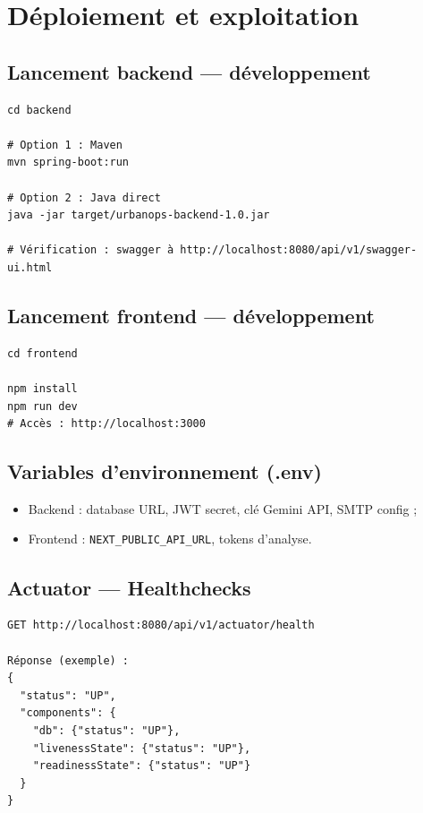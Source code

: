 \documentclass[12pt,a4paper,twoside,openright]{book}
\begin{document}
\chapter{Déploiement et exploitation}
\label{chap:deploy}

\section{Lancement backend — développement}
\begin{lstlisting}[style=bashurban,caption={Démarrage du backend Spring Boot.},label=lst:backend_run]
cd backend

# Option 1 : Maven
mvn spring-boot:run

# Option 2 : Java direct
java -jar target/urbanops-backend-1.0.jar

# Vérification : swagger à http://localhost:8080/api/v1/swagger-ui.html
\end{lstlisting}

\section{Lancement frontend — développement}
\begin{lstlisting}[style=bashurban,caption={Démarrage du frontend Next.js.},label=lst:frontend_run]
cd frontend

npm install
npm run dev
# Accès : http://localhost:3000
\end{lstlisting}

\section{Variables d'environnement (.env)}
\begin{itemize}
  \item Backend : database URL, JWT secret, clé Gemini API, SMTP config ;
  \item Frontend : \texttt{NEXT\_PUBLIC\_API\_URL}, tokens d'analyse.
\end{itemize}

\section{Actuator — Healthchecks}
\begin{lstlisting}[basicstyle=\ttfamily\footnotesize,breaklines=true]
GET http://localhost:8080/api/v1/actuator/health

Réponse (exemple) :
{
  "status": "UP",
  "components": {
    "db": {"status": "UP"},
    "livenessState": {"status": "UP"},
    "readinessState": {"status": "UP"}
  }
}
\end{lstlisting}
\end{document}
